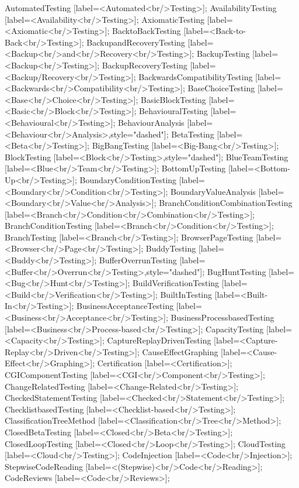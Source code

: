 \documentclass{article}
\begin{document}
{AutomatedTesting [label=<Automated<br/>Testing>];
AvailabilityTesting [label=<Availability<br/>Testing>];
AxiomaticTesting [label=<Axiomatic<br/>Testing>];
BacktoBackTesting [label=<Back-to-Back<br/>Testing>];
BackupandRecoveryTesting [label=<Backup<br/>and<br/>Recovery<br/>Testing>];
BackupTesting [label=<Backup<br/>Testing>];
BackupRecoveryTesting [label=<Backup/Recovery<br/>Testing>];
BackwardsCompatibilityTesting [label=<Backwards<br/>Compatibility<br/>Testing>];
BaseChoiceTesting [label=<Base<br/>Choice<br/>Testing>];
BasicBlockTesting [label=<Basic<br/>Block<br/>Testing>];
BehaviouralTesting [label=<Behavioural<br/>Testing>];
BehaviourAnalysis [label=<Behaviour<br/>Analysis>,style="dashed"];
BetaTesting [label=<Beta<br/>Testing>];
BigBangTesting [label=<Big-Bang<br/>Testing>];
BlockTesting [label=<Block<br/>Testing>,style="dashed"];
BlueTeamTesting [label=<Blue<br/>Team<br/>Testing>];
BottomUpTesting [label=<Bottom-Up<br/>Testing>];
BoundaryConditionTesting [label=<Boundary<br/>Condition<br/>Testing>];
BoundaryValueAnalysis [label=<Boundary<br/>Value<br/>Analysis>];
BranchConditionCombinationTesting [label=<Branch<br/>Condition<br/>Combination<br/>Testing>];
BranchConditionTesting [label=<Branch<br/>Condition<br/>Testing>];
BranchTesting [label=<Branch<br/>Testing>];
BrowserPageTesting [label=<Browser<br/>Page<br/>Testing>];
BuddyTesting [label=<Buddy<br/>Testing>];
BufferOverrunTesting [label=<Buffer<br/>Overrun<br/>Testing>,style="dashed"];
BugHuntTesting [label=<Bug<br/>Hunt<br/>Testing>];
BuildVerificationTesting [label=<Build<br/>Verification<br/>Testing>];
BuiltInTesting [label=<Built-In<br/>Testing>];
BusinessAcceptanceTesting [label=<Business<br/>Acceptance<br/>Testing>];
BusinessProcessbasedTesting [label=<Business<br/>Process-based<br/>Testing>];
CapacityTesting [label=<Capacity<br/>Testing>];
CaptureReplayDrivenTesting [label=<Capture-Replay<br/>Driven<br/>Testing>];
CauseEffectGraphing [label=<Cause-Effect<br/>Graphing>];
Certification [label=<Certification>];
CGIComponentTesting [label=<CGI<br/>Component<br/>Testing>];
ChangeRelatedTesting [label=<Change-Related<br/>Testing>];
CheckedStatementTesting [label=<Checked<br/>Statement<br/>Testing>];
ChecklistbasedTesting [label=<Checklist-based<br/>Testing>];
ClassificationTreeMethod [label=<Classification<br/>Tree<br/>Method>];
ClosedBetaTesting [label=<Closed<br/>Beta<br/>Testing>];
ClosedLoopTesting [label=<Closed<br/>Loop<br/>Testing>];
CloudTesting [label=<Cloud<br/>Testing>];
CodeInjection [label=<Code<br/>Injection>];
StepwiseCodeReading [label=<(Stepwise)<br/>Code<br/>Reading>];
CodeReviews [label=<Code<br/>Reviews>];
}
\end{document}
